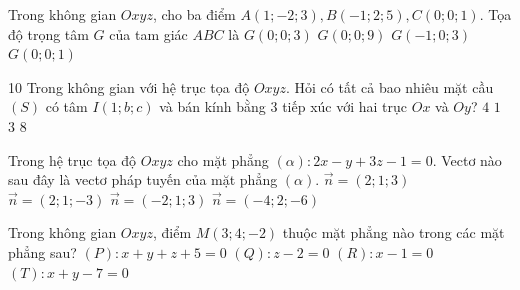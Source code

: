 \begin{ex}%
Trong không gian $O x y z$, cho ba điểm $A(1 ;-2 ; 3), B(-1 ; 2 ; 5), C(0 ; 0 ; 1)$. Tọa độ trọng tâm $G$ của tam giác $A B C$ là
\choice
{\True $G(0 ; 0 ; 3)$}
{$G(0 ; 0 ; 9)$}
{$G(-1 ; 0 ; 3)$}
{$G(0 ; 0 ; 1)$}
\end{ex}

\begin{ex}10%
Trong không gian với hệ trục tọa độ $Oxyz$. Hỏi có tất cả bao nhiêu mặt cầu $(S)$ có tâm $I(1;b;c)$ và bán kính bằng $3$ tiếp xúc với hai trục $Ox$ và $Oy$?
\choice
{\True $4$}
{$1$}
{$3$}
{$8$}
\end{ex}

\begin{ex}%
Trong hệ trục tọa độ $Oxyz$ cho mặt phẳng $(\alpha)\colon 2x-y+3z-1=0$. Vectơ nào sau đây là vectơ pháp tuyến của mặt phẳng $(\alpha)$.
\choice
{$\overrightarrow{n}=(2;1;3)$}
{$\overrightarrow{n}=(2;1;-3)$}
{$\overrightarrow{n}=(-2;1;3)$}
{\True $\overrightarrow{n}=(-4;2;-6)$}
\end{ex}

\begin{ex}%
Trong không gian $O x y z$, điểm $M(3 ; 4 ;-2)$ thuộc mặt phẳng nào trong các mặt phẳng sau?
\choice
{$(P): x+y+z+5=0$}
{$(Q): z-2=0$}
{$(R): x-1=0$}
{\True $(T): x+y-7=0$}
\end{ex}

